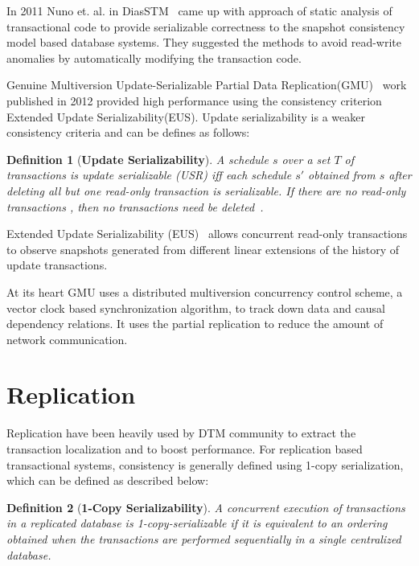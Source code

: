 \documentclass[12pt,english]{report}
\newtheorem{definition}{Definition}[section]
\begin{document}
In 2011 Nuno et. al. in DiasSTM~\cite{dias2011efficient} came up with approach of static analysis of transactional code to provide serializable correctness to the snapshot consistency model based database systems. They suggested the methods to avoid read-write anomalies by automatically modifying the transaction code.

Genuine Multiversion Update-Serializable Partial Data Replication(GMU)~\cite{GMU:peluso2012scalability} work published in 2012 provided high performance using the consistency criterion Extended Update Serializability(EUS). Update serializability is a weaker consistency criteria and can be defines as follows:

\begin{definition}[\textbf{Update Serializability}]
A schedule $s$ over a set $T$ of transactions is update serializable (USR) iff each schedule $s'$ obtained from $s$ after deleting all but one read-only transaction is serializable. If there are no read-only transactions , then no transactions need be deleted~\cite{UpdateSerializability1986}.
\end{definition}

Extended Update Serializability (EUS)~\cite{EUS:HansdahPatnaik} allows concurrent read-only transactions to observe snapshots generated from different linear extensions of the history of update transactions.

At its heart GMU uses a distributed multiversion concurrency control scheme, a vector clock based synchronization algorithm, to track down data and causal dependency relations. It uses the partial replication to reduce the amount of network communication. 

\section{Replication}
Replication have been heavily used by DTM community to extract the transaction localization and to boost performance. For replication based transactional systems, consistency is generally defined using 1-copy serialization, which can be defined as described below:

\begin{definition}[\textbf{1-Copy Serializability}]
A concurrent execution of transactions in a replicated database is 1-copy-serializable if it is equivalent  to an ordering obtained when the transactions are performed sequentially in a single centralized database.~\cite{bornea2011one}
\end{definition}
\end{document}
